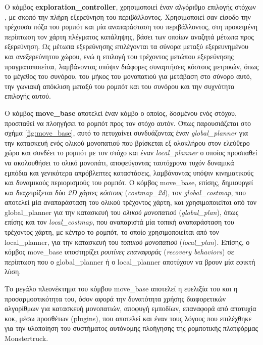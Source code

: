 \bigskip
Ο κόμβος \textbf{exploration{\_}controller}, χρησιμοποιεί έναν αλγόριθμο επιλογής στόχων \cite{zalidis_thesis}, με σκοπό την πλήρη εξερεύνηση του περιβάλλοντος. Χρησιμοποιεί σαν είσοδο την τρέχουσα πόζα του ρομπότ και μία αναπαράσταση του περιβάλλοντος, στη προκειμένη περίπτωση τον χάρτη πλέγματος κατάληψης, βάσει των οποίων αναζητά μέτωπα προς εξερεύνηση. Ως μέτωπα εξερεύνησης επιλέγονται τα σύνορα μεταξύ εξερευνημένου και ανεξερεύνητου χώρου, ενώ η επιλογή του τρέχοντος μετώπου εξερεύνησης πραγματοποιείται, λαμβάνοντας υπόψιν διάφορες συναρτήσεις κόστους μετρικών, όπως το μέγεθος του συνόρου, του μήκος του μονοπατιού για μετάβαση στο σύνορο αυτό, την γωνιακή απόκλιση μεταξύ του ρομπότ και του συνόρου και την συχνότητα επιλογής αυτού.

\bigskip
Ο κόμβος \textbf{move{\_}base} αποτελεί έναν κόμβο ο οποίος, δοσμένου ενός στόχου, προσπαθεί να πλοηγήσει το ρομπότ προς τον στόχο αυτόν. Όπως παρουσιάζεται στο σχήμα \ref{fig:move_base}, αυτό το πετυχαίνει συνδυάζοντας έναν \textit{global{\_}planner} για την κατασκευή ενός ολικού μονοπατιού που βρίσκεται εξ ολοκλήρου στον ελεύθερο χώρο και συνδέει το ρομπότ με τον στόχο και έναν \textit{local{\_}planner} ο οποίος προσπαθεί να ακολουθήσει το ολικό μονοπάτι, αποφεύγοντας ταυτόχρονα τυχόν δυναμικά εμπόδια και γενικότερα απρόβλεπτες καταστάσεις, λαμβάνοντας υπόψιν κινηματικούς και δυναμικούς περιορισμούς του ρομπότ. Ο κόμβος move{\_}base, επίσης, δημιουργεί και διαχειρίζεται δύο \textit{2D χάρτες κόστους} (\textit{costmap{\_}2d}), τον \textit{global{\_}costmap}, που αποτελεί μία αναπαράσταση του ολικού τρέχοντος χάρτη, και χρησιμοποιείται από τον global{\_}planner για την κατασκευή του \textit{ολικού μονοπατιού} (\textit{global{\_}plan}), όπως επίσης και τον \textit{local{\_}costmap}, που αναπαριστά μία τοπική αναπαράσταση του τρέχοντος χάρτη, με κέντρο το ρομπότ, το οποίο χρησιμοποιείται από τον local{\_}planner, για την κατασκευή του \textit{τοπικού μονοπατιού} (\textit{local{\_}plan}). Επίσης, ο κόμβος move{\_}base υποστηρίζει \textit{ρουτίνες επαναφοράς} (\textit{recovery behaviors}) σε περίπτωση που ο global{\_}planner ή ο local{\_}planner αποτύχουν να βρουν μία εφικτή λύση.

\bigskip
Το μεγάλο πλεονέκτημα του κόμβου move{\_}base αποτελεί η ευελιξία του και η προσαρμοστικότητα του, όσον αφορά την δυνατότητα χρήσης διαφορετικών αλγορίθμων για κατασκευή μονοπατιών, αποφυγή εμποδίων, επαναφορά από αποτυχία κοκ, μέσω προσθέτων (plugins), που αποτελεί και έναν τους λόγους που επιλέχθηκε για την υλοποίηση του συστήματος αυτόνομης πλοήγησης της ρομποτικής πλατφόρμας Monstertruck.

